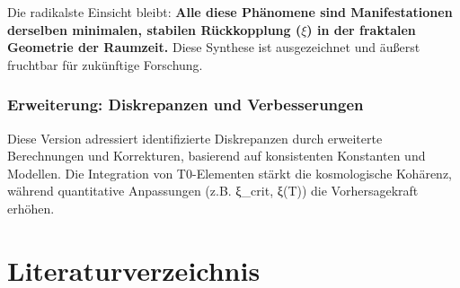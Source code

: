 \documentclass[12pt,a4paper]{article}
\begin{document}
	Die radikalste Einsicht bleibt: \textbf{Alle diese Phänomene sind Manifestationen derselben minimalen, stabilen Rückkopplung ($\xi$) in der fraktalen Geometrie der Raumzeit.} Diese Synthese ist ausgezeichnet und äußerst fruchtbar für zukünftige Forschung.
	
	\subsubsection*{Erweiterung: Diskrepanzen und Verbesserungen}
	Diese Version adressiert identifizierte Diskrepanzen durch erweiterte Berechnungen und Korrekturen, basierend auf konsistenten Konstanten und Modellen. Die Integration von T0-Elementen stärkt die kosmologische Kohärenz, während quantitative Anpassungen (z.B. ξ\_crit, ξ(T)) die Vorhersagekraft erhöhen.
	
	\section*{Literaturverzeichnis}
	
\end{document}

